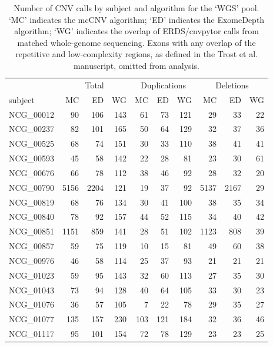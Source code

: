 \documentclass{bmcart}\usepackage[]{graphicx}\usepackage[]{color}
\begin{document}
\begin{backmatter}
\begin{table}[h!]
\centering
\caption{Number of CNV calls by subject and algorithm for the `WGS' pool. `MC' indicates the mcCNV algorithm; `ED' indicates the ExomeDepth algorithm; `WG' indicates the overlap of ERDS/cnvpytor calls from matched whole-genome sequencing. Exons with any overlap of the repetitive and low-complexity regions, as defined in the Trost et al. manuscript, omitted from analysis.} 
\label{tab:wgsCallBySbj}
\begin{tabular}{lrrrrrrrrr}
  \toprule   & \multicolumn{3}{c}{Total} & \multicolumn{3}{c}{Duplications} & \multicolumn{3}{c}{Deletions} \\ \cmidrule(lr){2-4}\cmidrule(lr){5-7}\cmidrule(lr){8-10}subject & MC & ED & WG & MC & ED & WG & MC & ED & WG \\ 
  \midrule
NCG\_00012 & 90 & 106 & 143 & 61 & 73 & 121 & 29 & 33 & 22 \\ 
  NCG\_00237 & 82 & 101 & 165 & 50 & 64 & 129 & 32 & 37 & 36 \\ 
  NCG\_00525 & 68 & 74 & 151 & 30 & 33 & 110 & 38 & 41 & 41 \\ 
  NCG\_00593 & 45 & 58 & 142 & 22 & 28 & 81 & 23 & 30 & 61 \\ 
  NCG\_00676 & 66 & 78 & 112 & 38 & 46 & 92 & 28 & 32 & 20 \\ 
  NCG\_00790 & 5156 & 2204 & 121 & 19 & 37 & 92 & 5137 & 2167 & 29 \\ 
  NCG\_00819 & 68 & 76 & 134 & 30 & 41 & 100 & 38 & 35 & 34 \\ 
  NCG\_00840 & 78 & 92 & 157 & 44 & 52 & 115 & 34 & 40 & 42 \\ 
  NCG\_00851 & 1151 & 859 & 141 & 28 & 51 & 102 & 1123 & 808 & 39 \\ 
  NCG\_00857 & 59 & 75 & 119 & 10 & 15 & 81 & 49 & 60 & 38 \\ 
  NCG\_00976 & 46 & 58 & 114 & 25 & 37 & 93 & 21 & 21 & 21 \\ 
  NCG\_01023 & 59 & 95 & 143 & 32 & 60 & 113 & 27 & 35 & 30 \\ 
  NCG\_01043 & 73 & 94 & 128 & 40 & 64 & 105 & 33 & 30 & 23 \\ 
  NCG\_01076 & 36 & 57 & 105 & 7 & 22 & 78 & 29 & 35 & 27 \\ 
  NCG\_01077 & 135 & 157 & 230 & 103 & 121 & 184 & 32 & 36 & 46 \\ 
  NCG\_01117 & 95 & 101 & 154 & 72 & 78 & 129 & 23 & 23 & 25 \\ 
   \bottomrule
\end{tabular}
\end{table}



\end{backmatter}
\end{document}
